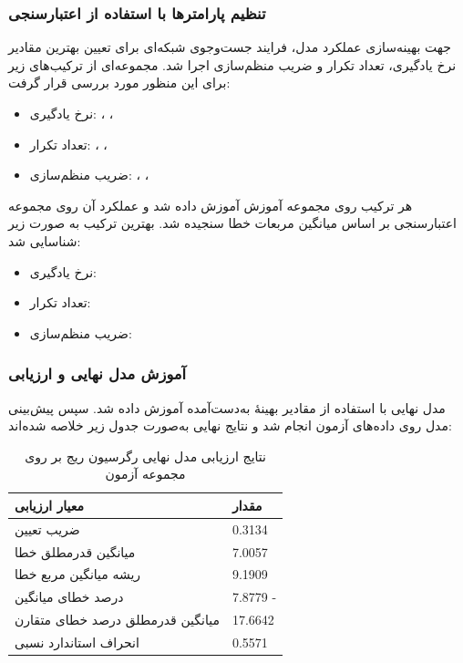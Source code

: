 \subsubsection{تنظیم پارامترها با استفاده از اعتبارسنجی}

جهت بهینه‌سازی عملکرد مدل، فرایند جست‌وجوی شبکه‌ای برای تعیین بهترین مقادیر نرخ یادگیری، تعداد تکرار و ضریب منظم‌سازی اجرا شد. مجموعه‌ای از ترکیب‌های زیر برای این منظور مورد بررسی قرار گرفت:

\begin{itemize}
	\item نرخ یادگیری: \texttt{}، \texttt{}، \texttt{}
	\item تعداد تکرار: \texttt{}، \texttt{}، \texttt{}
	\item ضریب منظم‌سازی: \texttt{}، \texttt{}، \texttt{}
\end{itemize}


هر ترکیب روی مجموعه آموزش آموزش داده شد و عملکرد آن روی مجموعه اعتبارسنجی بر اساس میانگین مربعات خطا سنجیده شد. بهترین ترکیب به صورت زیر شناسایی شد:

\begin{itemize}
	\item نرخ یادگیری: \texttt{}
	\item تعداد تکرار: \texttt{}
	\item ضریب منظم‌سازی: \texttt{}
\end{itemize}


\subsubsection{آموزش مدل نهایی و ارزیابی}

مدل نهایی با استفاده از مقادیر بهینهٔ به‌دست‌آمده آموزش داده شد. سپس پیش‌بینی مدل روی داده‌های آزمون انجام شد و نتایج نهایی به‌صورت جدول زیر خلاصه شده‌اند:

\vspace{0.3cm}
\begin{table}[H]
	\centering
	\caption{نتایج ارزیابی مدل نهایی رگرسیون ریج بر روی مجموعه آزمون}
	\renewcommand{\arraystretch}{1.3}
	\begin{tabular}{
			>{\centering\arraybackslash}m{4cm}
			>{\centering\arraybackslash}m{3cm}
		}
		\toprule
		\textbf{معیار ارزیابی} & \textbf{مقدار} \\
		\midrule
		ضریب تعیین & \num{0.3134} \\
		میانگین قدرمطلق خطا & \num{7.0057} \\
		ریشه میانگین مربع خطا & \num{9.1909} \\
		درصد خطای میانگین & \num{7.8779} -\\
		میانگین قدرمطلق درصد خطای متقارن & \num{17.6642} \\
		انحراف استاندارد نسبی & \num{0.5571} \\
		\bottomrule
	\end{tabular}
	\label{tab:ridge_gd_final}
\end{table}
\vspace{0.5cm}





